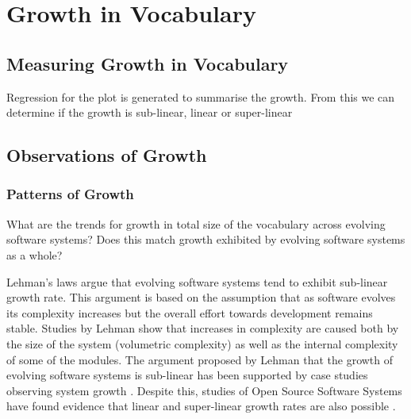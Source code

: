 % 
% 
% 

\section{Growth in Vocabulary} %
\label{sec:growth_in_vocabulary}

\subsection{Measuring Growth in Vocabulary} %
\label{sub:measuring_growth_in_vocabulary}


\crumbs
{
Regression for the plot is generated to summarise the growth. From this we can determine if the growth is sub-linear, linear or super-linear
}




\subsection{Observations of Growth} %
\label{sub:observations_of_growth}

\subsubsection{Patterns of Growth} %
\label{ssub:patterns_of_growth}

What are the trends for growth in total size of the vocabulary across evolving software systems? Does this match growth exhibited by evolving software systems as a whole?

Lehman's laws argue that evolving software systems tend to exhibit sub-linear growth rate.  This argument is based on the assumption that as software evolves its complexity increases but the overall effort towards development remains stable. Studies by Lehman \cite{Lehman97a} show that increases in complexity are caused both by the size of the system (volumetric complexity) as well as the internal complexity of some of the modules. The argument proposed by Lehman that the growth of evolving software systems is sub-linear has been supported by case studies observing system growth \cite{DAmbros07a, Gall97a, Lehman97a}. Despite this, studies of Open Source Software Systems have found evidence that linear and super-linear growth rates are also possible \cite{Godfrey01a,Israeli09a,Succi01a}.

